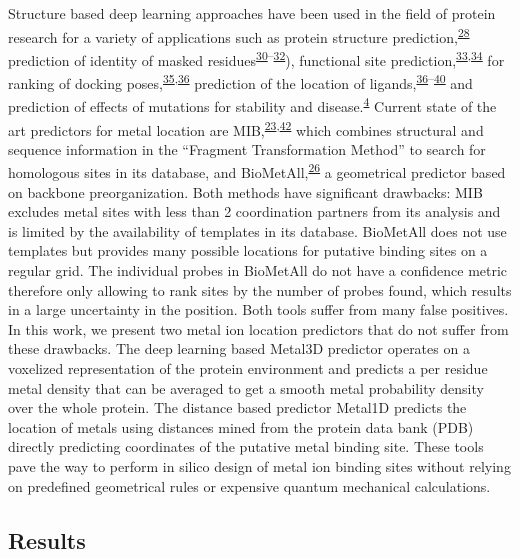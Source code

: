 \documentclass[  ASAPversion,
  ,
  9pt]{elife}
\begin{document}
Structure based deep learning approaches have been used in the field of protein research for a variety of applications such as protein structure prediction,\textsuperscript{\protect\hyperlink{ref-yZfcMIwh}{28}} prediction of identity of masked residues\textsuperscript{\protect\hyperlink{ref-ls5kyxZ3}{30}--\protect\hyperlink{ref-6szq3cwi}{32}}), functional site prediction,\textsuperscript{\protect\hyperlink{ref-SGggOw7Z}{33},\protect\hyperlink{ref-MKP16DSu}{34}} for ranking of docking poses,\textsuperscript{\protect\hyperlink{ref-q224Kv8w}{35},\protect\hyperlink{ref-yBhqGkBa}{36}} prediction of the location of ligands,\textsuperscript{\protect\hyperlink{ref-yBhqGkBa}{36}--\protect\hyperlink{ref-9UNjBvCL}{40}} and prediction of effects of mutations for stability and disease.\textsuperscript{\protect\hyperlink{ref-4sXp2sDw}{4}}
Current state of the art predictors for metal location are MIB,\textsuperscript{\protect\hyperlink{ref-1HMhB3vxM}{23},\protect\hyperlink{ref-k859wJxx}{42}} which combines structural and sequence information in the ``Fragment Transformation Method'' to search for homologous sites in its database, and BioMetAll,\textsuperscript{\protect\hyperlink{ref-iHxzzTCG}{26}} a geometrical predictor based on backbone preorganization. Both methods have significant drawbacks: MIB excludes metal sites with less than 2 coordination partners from its analysis and is limited by the availability of templates in its database. BioMetAll does not use templates but provides many possible locations for putative binding sites on a regular grid. The individual probes in BioMetAll do not have a confidence metric therefore only allowing to rank sites by the number of probes found, which results in a large uncertainty in the position. Both tools suffer from many false positives. In this work, we present two metal ion location predictors that do not suffer from these drawbacks. The deep learning based Metal3D predictor operates on a voxelized representation of the protein environment and predicts a per residue metal density that can be averaged to get a smooth metal probability density over the whole protein. The distance based predictor Metal1D predicts the location of metals using distances mined from the protein data bank (PDB) directly predicting coordinates of the putative metal binding site. These tools pave the way to perform in silico design of metal ion binding sites without relying on predefined geometrical rules or expensive quantum mechanical calculations.

\hypertarget{results}{%
\subsection{Results}\label{results}}
\end{document}
